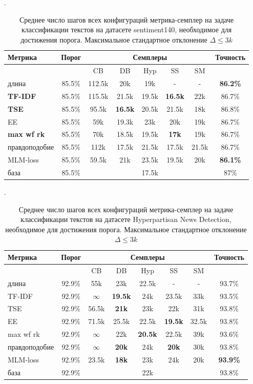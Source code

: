 \documentclass{spbau-diploma}
\begin{document}
\begin{table}[h]
	\caption{Среднее число шагов всех конфигураций метрика-семплер на задаче классификации текстов на датасете sentiment140, необходимое для достижения порога. Максимальное стандартное отклонение $\Delta \le 3k$}.
	\label{table:s140_fine_tuning}
	\centering
	\begin{tabular}{|l|c|ccccc|c|}
		\hline
		Метрика & Порог & & \multicolumn{3}{c}{Семплеры} & & Точность\\
		\hline
		& & CB & DB & Hyp & SS & SM &\\
		\hline
		длина & 85.5\% & 112.5k & 20k & 19k & - & - & {\bf 86.2\%} \\
		{\bf TF-IDF} & 85.5\% & 115.5k & 21.5k & 19.5k & {\bf 16.5k} & 22k & 86.7\% \\
		{\bf TSE} & 85.5\% & 95.5k & {\bf 16.5k} & 20.5k & 21.5k & 18k & 86.8\% \\
		EE & 85.5\% & 59k & 19.3k & 23k & 20k & 19k & 86.7\% \\
		{\bf max wf rk} & 85.5\% & 70k & 18.5k & 19.5k & {\bf 17k} & 19k & 86.7\% \\
		правдоподобие & 85.5\% & 112k & 17.5k & 21.5k & 17.5k & 21.5k & 86.7\% \\
		MLM-loss & 85.5\% & 59.5k & 21k & 23.5k & 19.5k & 20k & {\bf 86.1\%} \\
		\hline
		база & 85.5\% & & \multicolumn{3}{c}{17.5k} & & 87\% \\
		\hline
	\end{tabular}
\end{table}

\begin{table}[h]
	\caption{Среднее число шагов всех конфигураций метрика-семплер на задаче классификации текстов на датасете Hyperpartisan News Detection, необходимое для достижения порога. Максимальное стандартное отклонение $\Delta \le 3k$}.
	\label{table:hnd_fine_tuning}
	\centering
	\begin{tabular}{|l|c|ccccc|c|}
		\hline
		Метрика & Порог & & \multicolumn{3}{c}{Семплеры} & & Точность\\
		\hline
		& & CB & DB & Hyp & SS & SM & \\
		\hline
		длина & 92.9\% & 55k & 23k & 22.5k & - & - & 93.7\% \\
		TF-IDF & 92.9\%  & $\infty$ & {\bf 19.5k} & 24k & 23.5k & 33k & 93.5\% \\
		TSE & 92.9\% & 56.5k & {\bf 21k} & 23k & 22k & 31k & 93.8\% \\
		EE & 92.9\%  & 71.5k & 25.5k & 22.5k & {\bf 19.5k} & 32.5k & 93.8\% \\
		max wf rk & 92.9\%  & $\infty$ & 22k & {\bf 20.5k} & 22.5k & 39k & 93.6\% \\
		правдоподобие & 92.9\% & $\infty$ & {\bf 20k} & 24k & {\bf 20k} & 30k & 93.8\% \\
		MLM-loss & 92.9\% & 23.5k & {\bf 18k} & 23k & 24k & 20k & {\bf 93.9\%} \\
		\hline
		база & 92.9\%  & \multicolumn{5}{c}{22k} & 93.8\% \\
		\hline
	\end{tabular}
\end{table}
\end{document}
